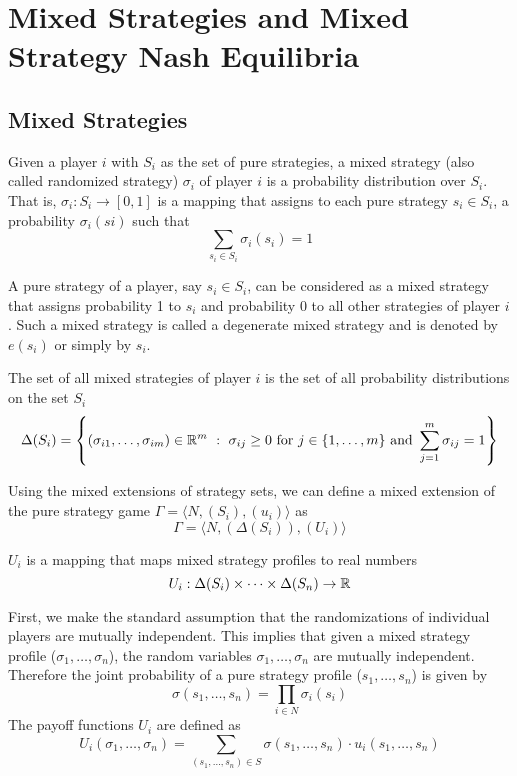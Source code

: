 \section{Mixed Strategies and Mixed Strategy Nash Equilibria}
\subsection{Mixed Strategies}
\begin{defn}
	Given a player $i$ with $S_i$ as the set of pure strategies, a mixed strategy (also called randomized strategy) $\sigma_i$ of player $i$ is a probability distribution over $S_i$.
	That is, $\sigma_i : S_i \rightarrow [0, 1]$ is a mapping that assigns to each pure strategy $s_i \in S_i$, a probability $\sigma_i(si)$ such that
	\[\sum_{s_i \in S_i}\sigma_i(s_i)=1\]
\end{defn}
A pure strategy of a player, say $s_i \in S_i$, can be considered as a mixed strategy that assigns probability 1 to $s_i$ and probability 0 to all other strategies of player $i$.
Such a mixed strategy is called a degenerate mixed strategy and is denoted by $e(s_i)$ or simply by $s_i$.
\begin{defn}
	The set of all mixed strategies of player $i$ is the set of all probability distributions on the set $S_i$
	\[\Delta(S_i)=\left\{(\sigma_{i1},\ldots,\sigma_{im}) \in \R^m \ : \ \sigma_{ij}\geq 0 \ \text{for} \ j \in \{1,\ldots,m\}\ \text{and}\ \sum_{j=1}^m \sigma_{ij}=1\right\}\]
\end{defn}
Using the mixed extensions of strategy sets, we can define a mixed extension of the pure strategy game $\Gamma = \langle N,(S_i),(u_i)\rangle$ as 
\[\Gamma = \langle N,(\Delta(S_i)),(U_i)\rangle\]
\begin{note}
	$U_i$ is a mapping that maps mixed strategy profiles to real numbers
	\[U_i:\Delta(S_i)\times\cdots\times\Delta(S_n)\rightarrow\mathbb{R}\]
\end{note}
First, we make the standard assumption that the randomizations of individual players are mutually independent.
This implies that given a mixed strategy profile ($\sigma_1,\ldots,\sigma_n$), the random variables $\sigma_1,\ldots,\sigma_n$ are mutually independent.
Therefore the joint probability of a pure strategy profile ($s_1,\ldots,s_n$) is given by
\[\sigma(s_1,\ldots,s_n)=\prod_{i\in N}\sigma_i(s_i)\]
The payoff functions $U_i$ are defined as
\[U_i(\sigma_1,\ldots,\sigma_n)=\sum_{(s_1,\ldots,s_n)\in S} \sigma(s_1,\ldots,s_n)\cdot u_i(s_1,\ldots,s_n)\]
